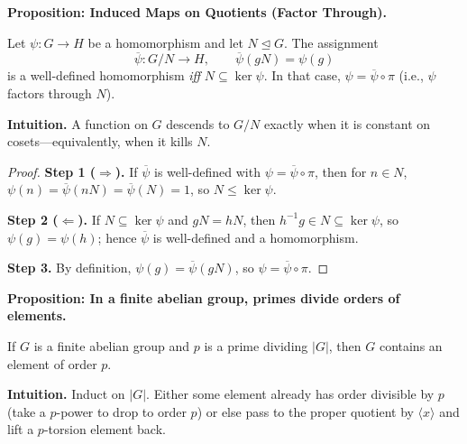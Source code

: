 \documentclass[9pt]{article}
\theoremstyle{definition}
\begin{document}
\newpage


\noindent\textbf{Proposition: Induced Maps on Quotients (Factor Through).}

\newpage

Let $\psi:G\to H$ be a homomorphism and let $N\trianglelefteq G$. The assignment
\[
\overline{\psi}:G/N\to H,\qquad \overline{\psi}(gN)=\psi(g)
\]
is a well-defined homomorphism \emph{iff} $N\subseteq \ker\psi$. In that case, $\psi=\overline{\psi}\circ\pi$ (i.e., $\psi$ factors through $N$).

\dotfill

\noindent\textbf{Intuition.}
A function on $G$ descends to $G/N$ exactly when it is constant on cosets—equivalently, when it kills $N$.

\dotfill

\begin{proof}
\textbf{Step 1 ($\Rightarrow$).} If $\overline{\psi}$ is well-defined with $\psi=\overline{\psi}\circ\pi$, then for $n\in N$, $\psi(n)=\overline{\psi}(nN)=\overline{\psi}(N)=1$, so $N\le\ker\psi$.

\textbf{Step 2 ($\Leftarrow$).} If $N\subseteq\ker\psi$ and $gN=hN$, then $h^{-1}g\in N\subseteq\ker\psi$, so $\psi(g)=\psi(h)$; hence $\overline{\psi}$ is well-defined and a homomorphism.

\textbf{Step 3.} By definition, $\psi(g)=\overline{\psi}(gN)$, so $\psi=\overline{\psi}\circ\pi$.
\end{proof}

\newpage

\noindent\textbf{Proposition: In a finite abelian group, primes divide orders of elements.}

\newpage

If $G$ is a finite abelian group and $p$ is a prime dividing $|G|$, then $G$ contains an element of order $p$.

\dotfill

\noindent\textbf{Intuition.}
Induct on $|G|$. Either some element already has order divisible by $p$ (take a $p$-power to drop to order $p$) or else pass to the proper quotient by $\langle x\rangle$ and lift a $p$-torsion element back.

\dotfill
\end{document}
